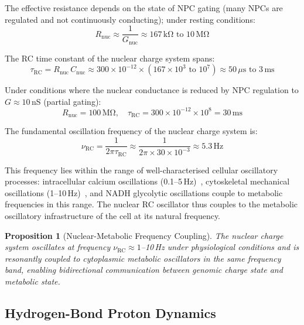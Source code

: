 \documentclass[11pt,twocolumn,a4paper]{article}
\newtheorem{proposition}[theorem]{Proposition}
\theoremstyle{definition}
\theoremstyle{remark}
\newcommand{\tauRC}{\tau_{\mathrm{RC}}}
\newcommand{\nuRC}{\nu_{\mathrm{RC}}}
\begin{document}
The effective resistance depends on the state of NPC gating (many NPCs are regulated and not continuously conducting); under resting conditions:
\begin{equation}
  R_{\mathrm{nuc}} \approx \frac{1}{G_{\mathrm{nuc}}} \approx 167\,\mathrm{k\Omega} \text{ to } 10\,\mathrm{M\Omega}
\end{equation}

The RC time constant of the nuclear charge system spans:
\begin{equation}
  \tauRC = R_{\mathrm{nuc}} \, C_{\mathrm{nuc}} \approx 300 \times 10^{-12} \times (167 \times 10^{3} \text{ to } 10^7) \approx 50\,\mu\mathrm{s} \text{ to } 3\,\mathrm{ms}
  \label{eq:tau_RC}
\end{equation}

Under conditions where the nuclear conductance is reduced by NPC regulation to $G \approx 10$\,nS (partial gating):
\begin{equation}
  R_{\mathrm{nuc}} = 100\,\mathrm{M\Omega}, \quad \tauRC = 300 \times 10^{-12} \times 10^8 = 30\,\mathrm{ms}
\end{equation}

The fundamental oscillation frequency of the nuclear charge system is:
\begin{equation}
  \nuRC = \frac{1}{2\pi \tauRC} \approx \frac{1}{2\pi \times 30 \times 10^{-3}} \approx 5.3\,\mathrm{Hz}
  \label{eq:nu_RC}
\end{equation}

This frequency lies within the range of well-characterised cellular oscillatory processes: intracellular calcium oscillations (0.1--5\,Hz)~\cite{Berridge1997}, cytoskeletal mechanical oscillations (1--10\,Hz)~\cite{Frey2006}, and NADH glycolytic oscillations couple to metabolic frequencies in this range. The nuclear RC oscillator thus couples to the metabolic oscillatory infrastructure of the cell at its natural frequency.

\begin{proposition}[Nuclear-Metabolic Frequency Coupling]
The nuclear charge system oscillates at frequency $\nuRC \approx 1$--10\,Hz under physiological conditions and is resonantly coupled to cytoplasmic metabolic oscillators in the same frequency band, enabling bidirectional communication between genomic charge state and metabolic state.
\label{prop:coupling}
\end{proposition}

\subsection{Hydrogen-Bond Proton Dynamics}
\end{document}
